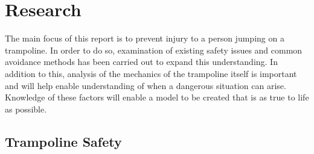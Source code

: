 \section{Research}\label{research}




\noindent The main focus of this report is to prevent injury to a person jumping on a trampoline. In order to do so, examination of existing safety issues and common avoidance methods has been carried out to expand this understanding. In addition to this, analysis of the mechanics of the trampoline itself is important and will help enable understanding of when a dangerous situation can arise. Knowledge of these factors will enable a model to be created that is as true to life as possible.  


\subsection{Trampoline Safety}\label{trampsafety}




